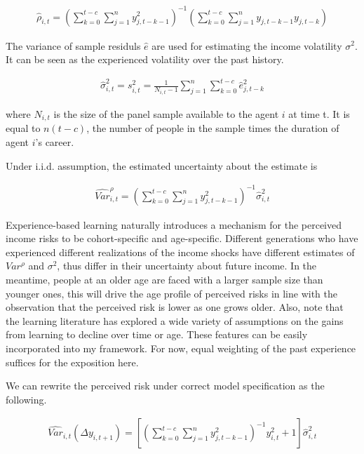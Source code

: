 \documentclass[12pt,notitlepage,onecolumn,aps,pra]{article}
\begin{document}
\begin{eqnarray}
\hat \rho_{i,t} = (\sum^{t-c}_{k=0}\sum^{n}_{j=1}y^2_{j,t-k-1})^{-1}(\sum^{t-c}_{k=0}\sum^{n}_{j=1}y_{j,t-k-1}y_{j,t-k})
\end{eqnarray}

The variance of sample residuls \(\widehat e\) are used for estimating
the income volatility \(\sigma^2\). It can be seen as the experienced
volatility over the past history.

\begin{eqnarray}
\widehat{\sigma}^2_{i,t} = s^2_{i,t} = \frac{1}{N_{i,t}-1} \sum^{n}_{j=1}\sum^{t-c}_{k=0} \hat e_{j,t-k}^2
\end{eqnarray}

where \(N_{i,t}\) is the size of the panel sample available to the agent
\(i\) at time t. It is equal to \(n(t-c)\), the number of people in the
sample times the duration of agent \(i\)'s career.

Under i.i.d. assumption, the estimated uncertainty about the estimate is

\begin{eqnarray}
\widehat {Var}^{\rho}_{i,t} = (\sum^{t-c}_{k=0}\sum^{n}_{j=1}y^2_{j,t-k-1})^{-1}\widehat{\sigma}^2_{i,t}
\end{eqnarray}

Experience-based learning naturally introduces a mechanism for the
perceived income risks to be cohort-specific and age-specific. Different
generations who have experienced different realizations of the income
shocks have different estimates of \(Var^{\rho}\) and \(\sigma^2\), thus
differ in their uncertainty about future income. In the meantime, people
at an older age are faced with a larger sample size than younger ones,
this will drive the age profile of perceived risks in line with the
observation that the perceived risk is lower as one grows older. Also,
note that the learning literature has explored a wide variety of
assumptions on the gains from learning to decline over time or age.
These features can be easily incorporated into my framework. For now,
equal weighting of the past experience suffices for the exposition here.

We can rewrite the perceived risk under correct model specification as
the following.

\begin{eqnarray}
\widehat{Var}_{i,t}(\Delta y_{i,t+1}) = [(\sum^{t-c}_{k=0}\sum^{n}_{j=1}y^2_{j,t-k-1})^{-1}y^2_{i,t} + 1] \hat{\sigma}^2_{i,t}
\end{eqnarray}
\end{document}
